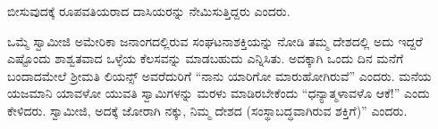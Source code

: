 ಬೀಸುವುದಕ್ಕೆ ರೂಪವತಿಯರಾದ ದಾಸಿಯರನ್ನು ನೇಮಿಸುತ್ತಿದ್ದರು ಎಂದರು. 

 ಒಮ್ಮೆ ಸ್ವಾಮೀಜಿ ಅಮೇರಿಕಾ ಜನಾಂಗದಲ್ಲಿರುವ ಸಂಘಟನಾಶಕ್ತಿಯನ್ನು ನೋಡಿ ತಮ್ಮ ದೇಶದಲ್ಲಿ ಅದು ಇದ್ದರೆ ಎಷ್ಟೊಂದು ಶಾಶ್ವತವಾದ ಒಳ್ಳೆಯ ಕೆಲಸವನ್ನು ಮಾಡಬಹುದು ಎನ್ನಿಸಿತು. ಅದಕ್ಕಾಗಿ ಒಂದು ದಿನ ಮನೆಗೆ ಬಂದಾದಮೇಲೆ ಶ‍್ರೀಮತಿ ಲಿಯನ್ಸ್ ಅವರೆದುರಿಗೆ “ನಾನು ಯಾರಿಗೋ ಮಾರುಹೋಗಿರುವೆ” ಎಂದರು. ಮನೆಯ ಯಜಮಾನಿ ಯಾವಳೋ ಯುವತಿ ಸ್ವಾಮಿಗಳನ್ನು ಮರಳು ಮಾಡಿರಬೇಕೆಂದು “ಧನ್ಯಾತ್ಮಳಾವಳೊ ಆಕೆ!” ಎಂದು ಕೇಳಿದರು. ಸ್ವಾಮೀಜಿ, ಅದಕ್ಕೆ ಜೋರಾಗಿ ನಕ್ಕು, ನಿಮ್ಮ ದೇಶದ  (ಸಂಸ್ಥಾಬದ್ಧವಾಗಿರುವ ಶಕ್ತಿಗೆ)” ಎಂದರು. 

